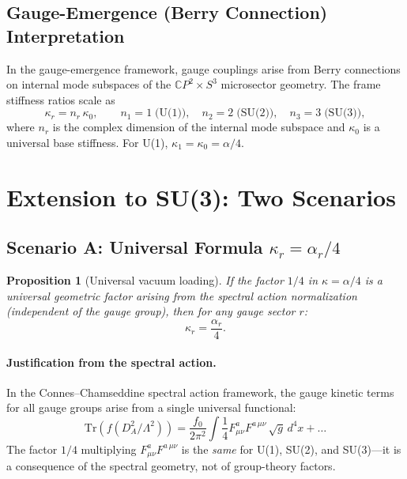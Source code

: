 \documentclass[11pt,letterpaper]{article}
\newcommand{\Tr}{\mathrm{Tr}}
\newtheorem{proposition}{Proposition}
\theoremstyle{definition}
\begin{document}
\subsection{Gauge-Emergence (Berry Connection) Interpretation}
\label{sec:berry-U1}

In the gauge-emergence framework, gauge couplings arise from Berry
connections on internal mode subspaces of the $\mathbb{C}P^2 \times S^3$
microsector geometry.  The frame stiffness ratios scale as
\begin{equation}
\kappa_r = n_r \, \kappa_0, \qquad
n_1 = 1\;\text{(U(1))}, \quad
n_2 = 2\;\text{(SU(2))}, \quad
n_3 = 3\;\text{(SU(3))},
\end{equation}
where $n_r$ is the complex dimension of the internal mode subspace
and $\kappa_0$ is a universal base stiffness.  For U(1),
$\kappa_1 = \kappa_0 = \alpha/4$.

\section{Extension to SU(3): Two Scenarios}\label{sec:SU3}

\subsection{Scenario A: Universal Formula $\kappa_r = \alpha_r/4$}
\label{sec:scenarioA}

\begin{proposition}[Universal vacuum loading]\label{prop:universal}
If the factor $1/4$ in $\kappa = \alpha/4$ is a \emph{universal}
geometric factor arising from the spectral action normalization
(independent of the gauge group), then for any gauge sector $r$:
\begin{equation}\label{eq:kappa-universal}
\boxed{\kappa_r = \frac{\alpha_r}{4}.}
\end{equation}
\end{proposition}

\paragraph{Justification from the spectral action.}
In the Connes--Chamseddine spectral action framework, the gauge
kinetic terms for all gauge groups arise from a single universal
functional:
\begin{equation}
\Tr\left(f(D_A^2/\Lambda^2)\right)
= \frac{f_0}{2\pi^2} \int \frac{1}{4} F_{\mu\nu}^a F^{a\,\mu\nu}\,
\sqrt{g}\,d^4x + \ldots
\end{equation}
The factor $1/4$ multiplying $F_{\mu\nu}^a F^{a\,\mu\nu}$ is the
\emph{same} for U(1), SU(2), and SU(3)---it is a consequence of
the spectral geometry, not of group-theory factors.
\end{document}
